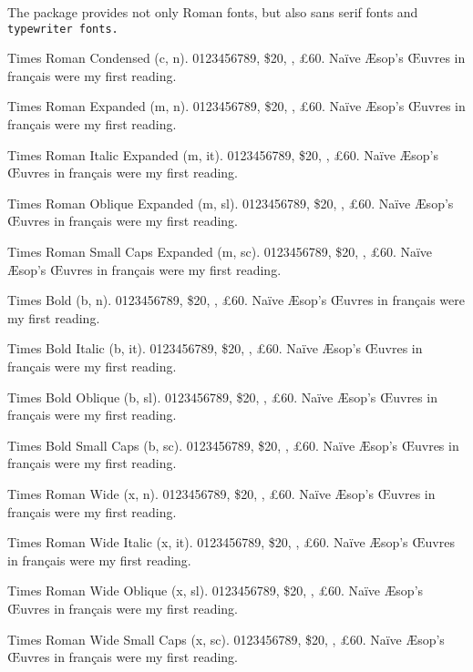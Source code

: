 \documentclass{article}
\begin{document}
The package provides not only Roman fonts, but also \textsf{sans serif
fonts} and \texttt{typewriter fonts.}

{\selectfont
  Times Roman Condensed (c, n).  0123456789, \$20, , \pounds60.
Na\"ive \AE sop's \OE uvres in fran\c cais were my first reading.
\lipsum[1]} 


Times Roman Expanded (m, n).  0123456789, \$20, , \pounds60.
Na\"ive \AE sop's \OE uvres in fran\c cais were my first reading.
\lipsum[2] 

{\selectfont
Times Roman Italic Expanded (m, it).  0123456789, \$20, , \pounds60.
Na\"ive \AE sop's \OE uvres in fran\c cais were my first reading.
\lipsum[3]}

{\selectfont
Times Roman Oblique Expanded (m, sl).  0123456789, \$20, , \pounds60.
Na\"ive \AE sop's \OE uvres in fran\c cais were my first reading.
\lipsum[4]}

{\selectfont
Times Roman Small Caps Expanded (m, sc).  0123456789, \$20, , \pounds60.
Na\"ive \AE sop's \OE uvres in fran\c cais were my first reading.
\lipsum[5]}

{\selectfont

Times Bold (b, n).  0123456789, \$20, , \pounds60.
Na\"ive \AE sop's \OE uvres in fran\c cais were my first reading.
\lipsum[6] 

{\selectfont
Times Bold Italic (b, it).  0123456789, \$20, , \pounds60.
Na\"ive \AE sop's \OE uvres in fran\c cais were my first reading.
\lipsum[7]}

{\selectfont
Times Bold Oblique (b, sl).  0123456789, \$20, , \pounds60.
Na\"ive \AE sop's \OE uvres in fran\c cais were my first reading.
\lipsum[8]}

{\selectfont
Times Bold Small Caps (b, sc).  0123456789, \$20, , \pounds60.
Na\"ive \AE sop's \OE uvres in fran\c cais were my first reading.
\lipsum[9]}
}

{\selectfont

Times Roman Wide (x, n).  0123456789, \$20, , \pounds60.
Na\"ive \AE sop's \OE uvres in fran\c cais were my first reading.
\lipsum[10] 

{\selectfont
Times Roman Wide Italic (x, it).  0123456789, \$20, , \pounds60.
Na\"ive \AE sop's \OE uvres in fran\c cais were my first reading.
\lipsum[11]}

{\selectfont
Times Roman Wide Oblique (x, sl).  0123456789, \$20, , \pounds60.
Na\"ive \AE sop's \OE uvres in fran\c cais were my first reading.
\lipsum[12]}

{\selectfont
Times Roman Wide Small Caps (x, sc).  0123456789, \$20,
, \pounds60. 
Na\"ive \AE sop's \OE uvres in fran\c cais were my first reading.
\lipsum[13]}
}
\end{document}
